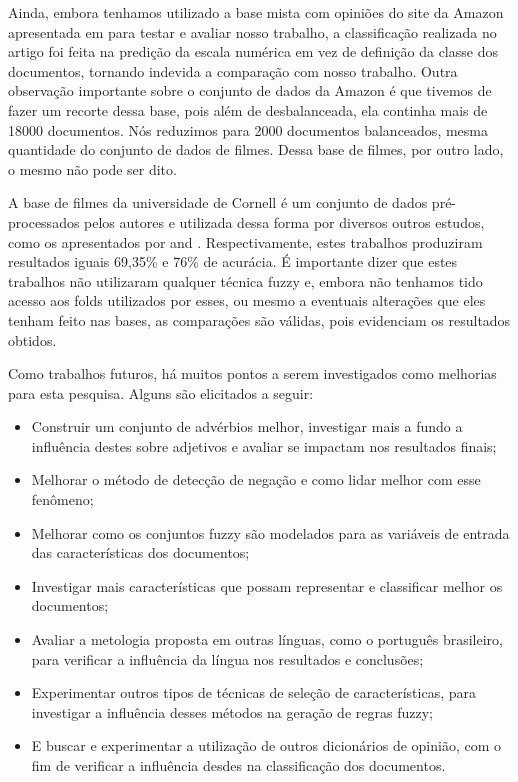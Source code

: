 \documentclass[template.tex]{subfiles}
\begin{document}

Ainda, embora tenhamos utilizado a base mista com opiniões do site da Amazon apresentada em  para testar e avaliar nosso trabalho, a classificação realizada no artigo foi feita na predição da escala numérica em vez de definição da classe dos documentos, tornando indevida a comparação com nosso trabalho. Outra observação importante sobre o conjunto de dados da Amazon é que tivemos de fazer um recorte dessa base, pois além de desbalanceada, ela continha mais de 18000 documentos. Nós reduzimos para 2000 documentos balanceados, mesma quantidade do conjunto de dados de filmes. Dessa base de filmes, por outro lado, o mesmo não pode ser dito.

A base de filmes da universidade de Cornell \cite{pang2004sentimental} é um conjunto de dados pré-processados pelos autores e utilizada dessa forma por diversos outros estudos, como os apresentados por  and . Respectivamente, estes trabalhos produziram resultados iguais 69,35\% e 76\% de acurácia. É importante dizer que estes trabalhos não utilizaram qualquer técnica fuzzy e, embora não tenhamos tido acesso aos folds utilizados por esses, ou mesmo a eventuais alterações que eles tenham feito nas bases, as comparações são válidas, pois evidenciam os resultados obtidos.

Como trabalhos futuros, há muitos pontos a serem investigados como melhorias para esta pesquisa. Alguns são elicitados a seguir:

\begin{itemize}
\item Construir um conjunto de advérbios melhor, investigar mais a fundo a influência destes sobre adjetivos e avaliar se impactam nos resultados finais;
\item Melhorar o método de detecção de negação e como lidar melhor com esse fenômeno;
\item Melhorar como os conjuntos fuzzy são modelados para as variáveis de entrada das características dos documentos;
\item Investigar mais características que possam representar e classificar melhor os documentos;
\item Avaliar a metologia proposta em outras línguas, como o português brasileiro, para verificar a influência da língua nos resultados e conclusões;
\item Experimentar outros tipos de técnicas de seleção de características, para investigar a influência desses métodos na geração de regras fuzzy;
\item E buscar e experimentar a utilização de outros dicionários de opinião, com o fim de verificar a influência desdes na classificação dos documentos.
\end{itemize}

\end{document}
